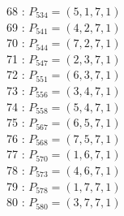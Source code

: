 \documentclass{article}
\begin{document}
{\begin{multicols}{3}
68 : $P_{534}=( 5, 1, 7, 1 )$\\
69 : $P_{541}=( 4, 2, 7, 1 )$\\
70 : $P_{544}=( 7, 2, 7, 1 )$\\
71 : $P_{547}=( 2, 3, 7, 1 )$\\
72 : $P_{551}=( 6, 3, 7, 1 )$\\
73 : $P_{556}=( 3, 4, 7, 1 )$\\
74 : $P_{558}=( 5, 4, 7, 1 )$\\
75 : $P_{567}=( 6, 5, 7, 1 )$\\
76 : $P_{568}=( 7, 5, 7, 1 )$\\
77 : $P_{570}=( 1, 6, 7, 1 )$\\
78 : $P_{573}=( 4, 6, 7, 1 )$\\
79 : $P_{578}=( 1, 7, 7, 1 )$\\
80 : $P_{580}=( 3, 7, 7, 1 )$\\
\end{multicols}


%


%


}%
\end{document}
